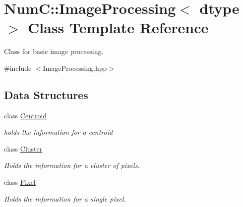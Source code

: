 \hypertarget{class_num_c_1_1_image_processing}{}\section{NumC\+:\+:Image\+Processing$<$ dtype $>$ Class Template Reference}
\label{class_num_c_1_1_image_processing}


Class for basic image processing.  




{\ttfamily \#include $<$Image\+Processing.\+hpp$>$}

\subsection*{Data Structures}
\begin{DoxyCompactItemize}
\item 
class \mbox{\hyperlink{class_num_c_1_1_image_processing_1_1_centroid}{Centroid}}
\begin{DoxyCompactList}\small\item\em holds the information for a centroid \end{DoxyCompactList}\item 
class \mbox{\hyperlink{class_num_c_1_1_image_processing_1_1_cluster}{Cluster}}
\begin{DoxyCompactList}\small\item\em Holds the information for a cluster of pixels. \end{DoxyCompactList}\item 
class \mbox{\hyperlink{class_num_c_1_1_image_processing_1_1_pixel}{Pixel}}
\begin{DoxyCompactList}\small\item\em Holds the information for a single pixel. \end{DoxyCompactList}\end{DoxyCompactItemize}
